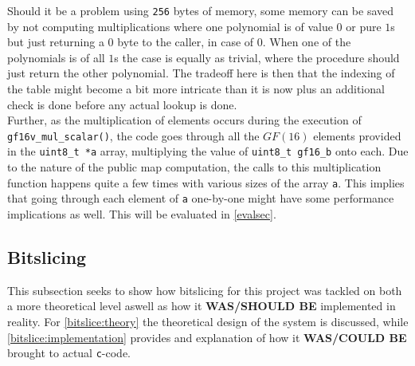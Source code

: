 Should it be a problem using \texttt{256} bytes of memory, some memory can be saved by not computing multiplications where one polynomial is of value $0$ or pure $1$s but just returning a $0$ byte to the caller, in case of $0$. When one of the polynomials is of all $1$s the case is equally as trivial, where the procedure should just return the other polynomial. The tradeoff here is then that the indexing of the table might become a bit more intricate than it is now plus an additional check is done before any actual lookup is done.\medskip\\
Further, as the multiplication of elements occurs during the execution of \texttt{gf16v\_mul\_scalar()}, the code goes through all the $GF(16)$ elements provided in the \texttt{uint8\_t *a} array, multiplying the value of \texttt{uint8\_t gf16\_b} onto each. Due to the nature of the public map computation, the calls to this multiplication function happens quite a few times with various sizes of the array \texttt{a}. This implies that going through each element of \texttt{a} one-by-one might have some performance implications as well. This will be evaluated in \cref{evalsec}.
\subsection{Bitslicing} \label{opt:bitslice}
This subsection seeks to show how bitslicing for this project was tackled on both a more theoretical level aswell as how it \textbf{WAS/SHOULD BE} implemented in reality. For \cref{bitslice:theory} the theoretical design of the system is discussed, while \cref{bitslice:implementation} provides and explanation of how it \textbf{WAS/COULD BE} brought to actual \texttt{c}-code.
